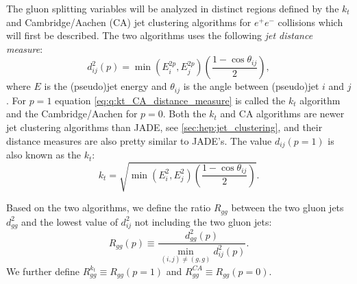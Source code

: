 \begin{enumerate}[leftmargin=*,labelindent=40pt]
\end{enumerate}

The gluon splitting variables will be analyzed in distinct regions defined by the $k_t$ \citep{cataniLongitudinallyinvariantKtclusteringAlgorithms1993,ellisSuccessiveCombinationJet1993} and Cambridge/Aachen (CA) \citep{dokshitzerBetterJetClustering1997,wobischHadronizationCorrectionsJet1999} jet clustering algorithms for $e^+e^-$ collisions which will first be described. The two algorithms uses the following \emph{jet distance measure}:
\begin{equation}
  \label{eq:q:kt_CA_distance_measure}
  d_{ij}^2(p) = \min \left(E_i^{2p}, E_j^{2p} \right) \left(\frac{1-\cos \theta_{ij}}{2} \right), 
\end{equation}
where $E$ is the (pseudo)jet energy and $\theta_{ij}$ is the angle between (pseudo)jet $i$ and $j$ \autocite{cacciariFastJetUserManual2012}. For $p=1$ equation \eqref{eq:q:kt_CA_distance_measure} is called the $k_t$ algorithm and the Cambridge/Aachen for $p=0$. Both the $k_t$ and CA algorithms are newer jet clustering algorithms than JADE, see \autoref{sec:hep:jet_clustering}, and their distance measures are also pretty similar to JADE's. The value $d_{ij}(p=1)$ is also known as the $k_t$:
\begin{equation}
  \label{eq:q:k_t_definition_kt}
  k_t = \sqrt{\min \left(E_i^2, E_j^2 \right) \left(\frac{1-\cos \theta_{ij}}{2} \right)}.
\end{equation}

Based on the two algorithms, we define the ratio $R_{gg}$ between the two gluon jets $d^2_{gg}$ and the lowest value of $d^2_{ij}$ not including the two gluon jets:
\begin{equation}
  R_{gg}(p) \equiv \frac{d^2_{gg}(p)}{\min_{(i,j) \neq (g,g)} d^2_{ij}(p)}.
\end{equation} 
We further define $R_{gg}^{k_t} \equiv R_{gg}(p=1)$ and $R_{gg}^{CA} \equiv R_{gg}(p=0)$. 

